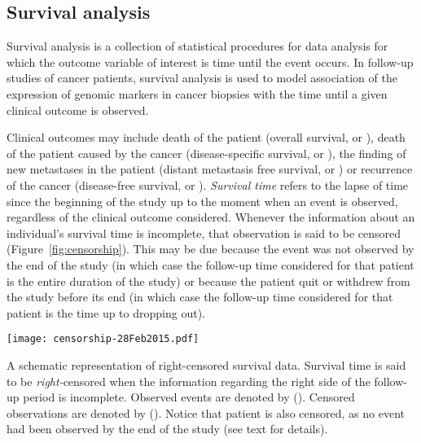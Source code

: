 
\subsection{Survival analysis}
\label{sec:methods-survival-analysis}

Survival analysis is a collection of statistical procedures for data analysis
for which the outcome variable of interest is time until the event
occurs.\cite{kleinbaum_survival_1996} In follow-up studies of cancer patients,
survival analysis is used to model association of the expression of genomic
markers in cancer biopsies with the time until a given clinical outcome is
observed.

Clinical outcomes may include death of the patient (overall survival, or
), death of the patient caused by the cancer (disease-specific
survival, or ), the finding of new metastases in the patient
(distant metastasis free survival, or ) or recurrence of the
cancer (disease-free survival, or ).  \emph{Survival time} refers
to the lapse of time since the beginning of the study up to the moment when an
event is observed, regardless of the clinical outcome considered.  Whenever the
information about an individual's survival time is incomplete, that observation
is said to be censored (Figure~\ref{fig:censorship}).  This may be due because
the event was not observed by the end of the study (in which case the follow-up
time considered for that patient is the entire duration of the study) or because
the patient quit or withdrew from the study before its end (in which case the
follow-up time considered for that patient is the time up to dropping out).

\begin{marginfigure}%
  \texttt{[image: censorship-28Feb2015.pdf]}
  \caption[Right-censored survival data]{A schematic representation of
    right-censored survival data.  Survival time is said to be
    \emph{right-}censored when the information regarding the right side of the
    follow-up period is incomplete.  Observed events are denoted by (\CIRCLE).
    Censored observations are denoted by (\Circle).  Notice that patient
     is also censored, as no event had been observed by the end
    of the study (see text for details).}\label{fig:censorship}%
\end{marginfigure}

